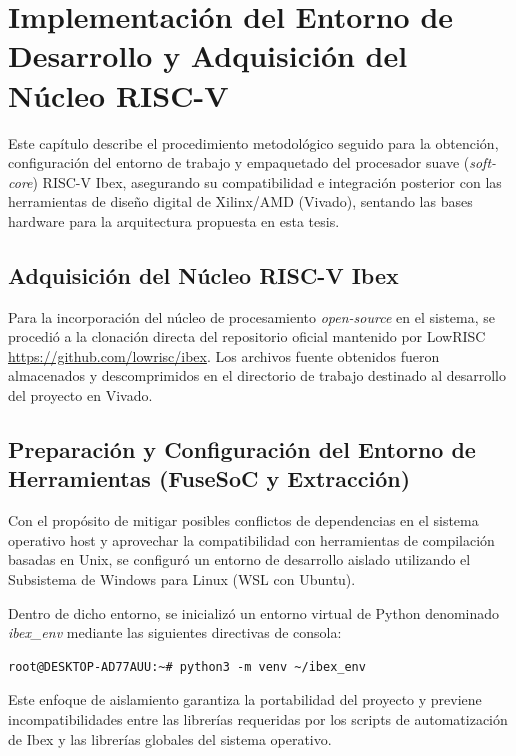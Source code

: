 \chapter{Implementación del Entorno de Desarrollo y Adquisición del Núcleo RISC-V}
\label{ch:implementacion_entorno}

Este capítulo describe el procedimiento metodológico seguido para la obtención, configuración del entorno de trabajo y empaquetado del procesador suave (\textit{soft-core}) RISC-V Ibex, asegurando su compatibilidad e integración posterior con las herramientas de diseño digital de Xilinx/AMD (Vivado), sentando las bases hardware para la arquitectura propuesta en esta tesis.

\section{Adquisición del Núcleo RISC-V Ibex}
Para la incorporación del núcleo de procesamiento \textit{open-source} en el sistema, se procedió a la clonación directa del repositorio oficial mantenido por LowRISC \url{https://github.com/lowrisc/ibex}. Los archivos fuente obtenidos fueron almacenados y descomprimidos en el directorio de trabajo destinado al desarrollo del proyecto en Vivado.

\section{Preparación y Configuración del Entorno de Herramientas (FuseSoC y Extracción)}
Con el propósito de mitigar posibles conflictos de dependencias en el sistema operativo host y aprovechar la compatibilidad con herramientas de compilación basadas en Unix, se configuró un entorno de desarrollo aislado utilizando el Subsistema de Windows para Linux (WSL con Ubuntu).

Dentro de dicho entorno, se inicializó un entorno virtual de Python denominado \textit{ibex\_env} mediante las siguientes directivas de consola:

\begin{lstlisting}[style=bashstyle]
root@DESKTOP-AD77AUU:~# python3 -m venv ~/ibex_env
\end{lstlisting}

Este enfoque de aislamiento garantiza la portabilidad del proyecto y previene incompatibilidades entre las librerías requeridas por los scripts de automatización de Ibex y las librerías globales del sistema operativo.



